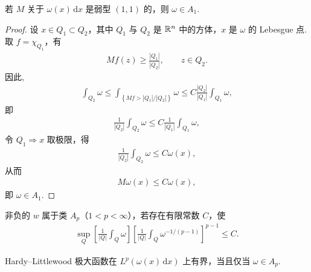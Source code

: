 \begin{theorem}\label{thm:4.13}
若 $M$ 关于 $\omega(x)\,\mathrm{d}x$ 是弱型 $(1,1)$ 的，则 $\omega \in A_1$.
\end{theorem}

\begin{proof}
设 $x \in Q_1 \subset Q_2$，其中 $Q_1$ 与 $Q_2$ 是 $\mathbb{R}^n$ 中的方体，$x$ 是 $\omega$ 的 Lebesgue 点. 取 $f = \chi_{Q_1}$，有
\begin{align*}
  Mf(z)\geq\frac{|Q_{1}|}{|Q_{2}|},\qquad z\in Q_{2}.
\end{align*}
因此,
\begin{align*}
  \int_{Q_{2}}\omega\leq\int_{\left\{M f>|Q_{1}|/|Q_{2}|\right\}}\omega
  \leq C\frac{|Q_{2}|}{|Q_{1}|}\int_{Q_{1}}\omega,
\end{align*}
即
\begin{align*}
  \frac{1}{\left|Q_{2}\right|}\int_{Q_{2}}\omega\leq C\frac{1}{\left|Q_{1}\right|}\int_{Q_{1}}\omega,
\end{align*}
令 $Q_1 \Rightarrow x$ 取极限，得
\begin{align*}
  \frac{1}{\left|Q_{2}\right|}\int_{Q_{2}}\omega\leq C\omega(x),
\end{align*}
从而
\begin{align*}
  M\omega(x)\leq C\omega(x),
\end{align*}
即 $\omega \in A_1$.
\end{proof}

\begin{definition}\label{def:4.14}
非负的 $w$ 属于类 $A_p$（$1 < p < \infty$），若存在有限常数 $C$，使
\begin{align*}
  \sup_{Q}\left[\frac{1}{|Q|}\int_{Q}\omega\right]
  \left[\frac{1}{|Q|}\int_{Q}\omega^{-1/(p-1)}\right]^{p-1}\leq C.
\end{align*}
\end{definition}

\begin{theorem}\label{thm:4.15}
Hardy--Littlewood 极大函数在 $L^p(\omega(x)\,\mathrm{d}x)$ 上有界，当且仅当 $\omega \in A_p$.
\end{theorem}

